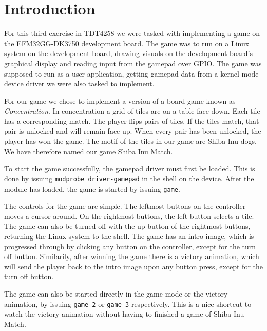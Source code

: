 \chapter{Introduction}

For this third exercise in TDT4258 we were tasked with implementing a game on
the EFM32GG-DK3750 development board. The game was to run on a Linux system on
the development board, drawing visuals on the development board's graphical
display and reading input from the gamepad over GPIO. The game was supposed to
run as a user application, getting gamepad data from a kernel mode device driver
we were also tasked to implement.

For our game we chose to implement a version of a board game known as
\emph{Concentration}. In concentration a grid of tiles are on a table face down.
Each tile has a corresponding match. The player flips pairs of tiles. If the
tiles match, that pair is unlocked and will remain face up. When every pair has
been unlocked, the player has won the game. The motif of the tiles in our game
are Shiba Inu dogs. We have therefore named our game Shiba Inu Match.

To start the game successfully, the gamepad driver must first be loaded. This is
done by issuing \texttt{modprobe driver-gamepad} in the shell on the device.
After the module has loaded, the game is started by issuing \texttt{game}.

The controls for the game are simple. The leftmost buttons on the controller
moves a cursor around. On the rightmost buttons, the left button selects a tile.
The game can also be turned off with the up button of the rightmost buttons,
returning the Linux system to the shell. The game has an intro image, which is
progressed through by clicking any button on the controller, except for the
turn off button. Similarily, after winning the game there is a victory
animation, which will send the player back to the intro image upon any button
press, except for the turn off button.

The game can also be started directly in the game mode or the victory animation,
by issuing \texttt{game 2} or \texttt{game 3} respectively. This is a nice
shortcut to watch the victory animation without having to finished a game of
Shiba Inu Match.
